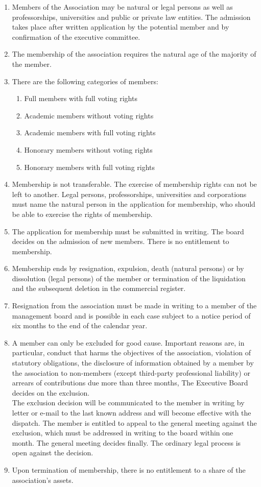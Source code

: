 \documentclass{article}
\begin{document}
\begin{enumerate}
	\item Members of the Association may be natural or legal persons as well as professorships, universities and public or private law entities. The admission takes place after written application by the potential member and by confirmation of the executive committee.
	\item The membership of the association requires the natural age of the majority of the member.
	\item There are the following categories of members:
	
	\begin{enumerate}
		\item Full members with full voting rights
		\item  Academic members without voting rights
		\item  Academic members with full voting rights
		\item  Honorary members without voting rights
		\item  Honorary members with full voting rights
	\end{enumerate}
	
	\item Membership is not transferable. 
	The exercise of membership rights can not be left to another. 
	Legal persons, professorships, universities and corporations must name the natural person in the application for membership, who should be able to exercise the rights of membership.
	\item The application for membership must be submitted in writing. 
	The board decides on the admission of new members. 
	There is no entitlement to membership.
	\item Membership ends by resignation, expulsion, death (natural persons) or by dissolution (legal persons) of the member or termination of the liquidation and the subsequent deletion in the commercial register.
	\item Resignation from the association must be made in writing to a member of the management board and is possible in each case subject to a notice period of six months to the end of the calendar year.
	\item A member can only be excluded for good cause.
	 Important reasons are, in particular, conduct that harms the objectives of the association, violation of statutory obligations, the disclosure of information obtained by a member by the association to non-members (except third-party professional liability) or arrears of contributions due more than three months, The Executive Board decides on the exclusion. \\
The exclusion decision will be communicated to the member in writing by letter or e-mail to the last known address and will become effective with the dispatch. 
The member is entitled to appeal to the general meeting against the exclusion, which must be addressed in writing to the board within one month. 
The general meeting decides finally. The ordinary legal process is open against the decision.
	\item Upon termination of membership, there is no entitlement to a share of the association's assets.
\end{enumerate}
\end{document}
